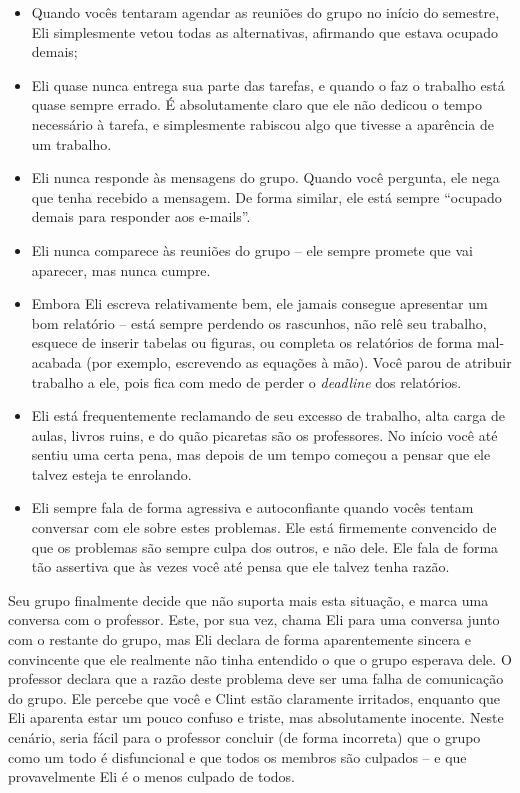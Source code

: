 \documentclass{letter}
\begin{document}
\begin{letter}{}
\begin{itemize}
\item Quando vocês tentaram agendar as reuniões do grupo no início do semestre, Eli simplesmente vetou todas as alternativas, afirmando que estava ocupado demais;
\item Eli quase nunca entrega sua parte das tarefas, e quando o faz o trabalho está quase sempre errado. É absolutamente claro que ele não dedicou o tempo necessário à tarefa, e simplesmente rabiscou algo que tivesse a aparência de um trabalho.
\item Eli nunca responde às mensagens do grupo. Quando você pergunta, ele nega que tenha recebido a mensagem. De forma similar, ele está sempre ``ocupado demais para responder aos e-mails''.
\item Eli nunca comparece às reuniões do grupo -- ele sempre promete que vai aparecer, mas nunca cumpre.
\item Embora Eli escreva relativamente bem, ele jamais consegue apresentar um bom relatório -- está sempre perdendo os rascunhos, não relê seu trabalho, esquece de inserir tabelas ou figuras, ou completa os relatórios de forma mal-acabada (por exemplo, escrevendo as equações à mão). Você parou de atribuir trabalho a ele, pois fica com medo de perder o \textit{deadline} dos relatórios.
\item Eli está frequentemente reclamando de seu excesso de trabalho, alta carga de aulas, livros ruins, e do quão picaretas são os professores. No início você até sentiu uma certa pena, mas depois de um tempo começou a pensar que ele talvez esteja te enrolando.
\item Eli sempre fala de forma agressiva e autoconfiante quando vocês tentam conversar com ele sobre estes problemas. Ele está firmemente convencido de que os problemas são sempre culpa dos outros, e não dele. Ele fala de forma tão assertiva que às vezes você até pensa que ele talvez tenha razão.
\end{itemize}

Seu grupo finalmente decide que não suporta mais esta situação, e marca uma conversa com o professor. Este, por sua vez, chama Eli para uma conversa junto com o restante do grupo, mas Eli declara de forma aparentemente sincera e convincente que ele realmente não tinha entendido o que o grupo esperava dele. O professor declara que a razão deste problema deve ser uma falha de comunicação do grupo. Ele percebe que você e Clint estão claramente irritados, enquanto que Eli aparenta estar um pouco confuso e triste, mas absolutamente inocente. Neste cenário, seria fácil para o professor concluir (de forma incorreta) que o grupo como um todo é disfuncional e que todos os membros são culpados -- e que provavelmente Eli é o menos culpado de todos.


\end{letter}
\end{document}
